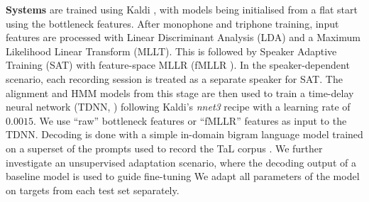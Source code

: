 \documentclass[a4paper]{article}
\begin{document}
\textbf{Systems} are trained using Kaldi \cite{povey2011kaldi}, with models being initialised from a flat start using the bottleneck features.
After monophone and triphone training, input features are processed with Linear Discriminant Analysis (LDA) and a Maximum Likelihood Linear Transform  (MLLT).
This is followed by Speaker Adaptive Training (SAT) with feature-space MLLR (fMLLR \cite{rath2013improved}).
In the speaker-dependent scenario, each recording session is treated as a separate speaker for SAT.
The alignment and HMM models from this stage are then used to train a time-delay neural network (TDNN, \cite{peddinti2015time}) following Kaldi's \emph{nnet3} recipe with a learning rate of $0.0015$.
We use \enquote{raw} bottleneck features or \enquote{fMLLR} features as input to the TDNN.
Decoding is done with a simple in-domain bigram language model trained on a superset of the prompts used to record the TaL corpus \cite{ribeiro2021tal}.
We further investigate an unsupervised adaptation scenario, where the decoding output of a baseline model is used to guide fine-tuning
We adapt all parameters of the model on targets from each test set separately.
\end{document}
